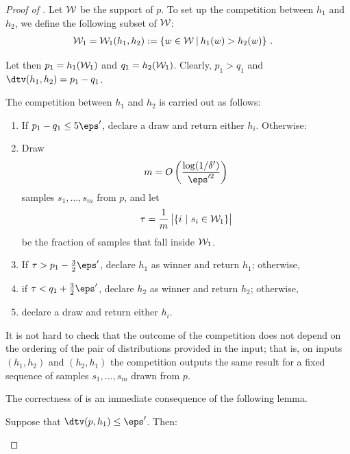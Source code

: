 \begin{proof}[Proof of ]
Let ${\cal W}$ be the support of $p$. To set up the competition between $h_1$ and $h_2$, we define the following subset of ${\cal W}$:
\begin{align}
&{\cal W}_1={\cal W}_1(h_1,h_2) := \left\{w \in \mathcal{W}~\vline~h_1(w) > h_2(w) \right\}\,. \label{eq:W1}
%
%
\end{align}

\noindent Let then $p_1 = h_1({\cal W}_1)$ and $q_1 = h_2({\cal W}_1)$. Clearly, $p_1 > q_1$ and
 $\dtv(h_1, h_2) = p_1-q_1$.

%

The competition between $h_1$ and $h_2$ is carried out as follows:

\begin{enumerate}
\item  If $p_1-q_1\leq 5 \eps'$, declare a draw and return either $h_i$. Otherwise:

\item  Draw 
  \[
  m=O\left(\frac{\log(1/\delta')}{\eps'^2}\right)
  \]
  samples $s_1,\ldots,s_m$ from $p$, and let 
  \[
  \tau = \frac{1}{m}\, \bigl| \{i~|~s_i \in {\cal W}_1 \}\bigr|
  \]
  be the fraction of  samples that fall inside ${\cal W}_1$.


\item  If $\tau > p_1- \frac{3}{2} \eps'$, declare $h_1$ as winner and return $h_1$; otherwise,

\item  if $\tau < q_1+ \frac{3}{2} \eps'$, declare $h_2$ as winner and return $h_2$; otherwise,

\item  declare a draw and return either $h_i$.

\end{enumerate}

It is not hard to check that the outcome of the competition does not depend on the ordering of the pair of distributions provided in the input; that is, on inputs $(h_1,h_2)$ and $(h_2,h_1)$ the competition outputs the same result for a fixed sequence of samples $s_1,\ldots,s_m$ drawn from $p$.

The correctness of  is an immediate consequence of the following lemma.

%

\begin{lemma} \label{lem:kostas3}
Suppose that $\dtv(p,h_1) \leq \eps'$. Then:
\begin{itemize}


\end{itemize}
\end{lemma}
\end{proof}
